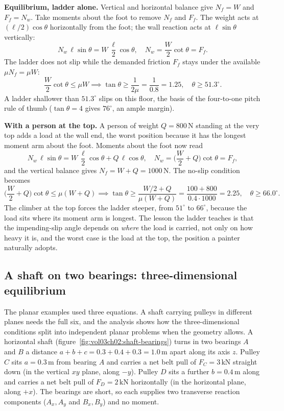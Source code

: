 \textbf{Equilibrium, ladder alone.} Vertical and horizontal balance give
$N_f = W$ and $F_f = N_w$. Take moments about the foot to remove $N_f$ and
$F_f$. The weight acts at $(\ell/2)\cos\theta$ horizontally from the foot;
the wall reaction acts at $\ell\sin\theta$ vertically:
\[
N_w \,\ell\sin\theta = W\,\frac{\ell}{2}\cos\theta, \quad
N_w = \frac{W}{2}\cot\theta = F_f.
\]
The ladder does not slip while the demanded friction $F_f$ stays under the
available $\mu N_f = \mu W$:
\[
\frac{W}{2}\cot\theta \le \mu W \implies
\tan\theta \ge \frac{1}{2\mu} = \frac{1}{0.8} = 1.25, \quad
\theta \ge 51.3^{\circ}.
\]
A ladder shallower than $51.3^{\circ}$ slips on this floor, the basis of the
four-to-one pitch rule of thumb ($\tan\theta = 4$ gives $76^{\circ}$, an
ample margin).

\textbf{With a person at the top.} A person of weight $Q = 800\,\text{N}$
standing at the very top adds a load at the wall end, the worst position
because it has the longest moment arm about the foot. Moments about the foot
now read
\[
N_w\,\ell\sin\theta = W\,\frac{\ell}{2}\cos\theta + Q\,\ell\cos\theta,
\quad N_w = \Big(\frac{W}{2} + Q\Big)\cot\theta = F_f,
\]
and the vertical balance gives $N_f = W + Q = 1000\,\text{N}$. The no-slip
condition becomes
\[
\Big(\frac{W}{2} + Q\Big)\cot\theta \le \mu (W + Q) \implies
\tan\theta \ge \frac{W/2 + Q}{\mu (W + Q)}
= \frac{100 + 800}{0.4 \cdot 1000} = 2.25, \quad
\theta \ge 66.0^{\circ}.
\]
The climber at the top forces the ladder steeper, from $51^{\circ}$ to
$66^{\circ}$, because the load sits where its moment arm is longest. The
lesson the ladder teaches is that the impending-slip angle depends on
\emph{where} the load is carried, not only on how heavy it is, and the
worst case is the load at the top, the position a painter naturally adopts.

\subsection{A shaft on two bearings: three-dimensional equilibrium}

The planar examples used three equations. A shaft carrying pulleys in
different planes needs the full six, and the analysis shows how the
three-dimensional conditions split into independent planar problems when the
geometry allows. A horizontal shaft (figure~\ref{fig:vol03ch02:shaft-bearings})
turns in two bearings $A$ and $B$ a distance $a + b + c = 0.3 + 0.4 + 0.3 =
1.0\,\si{\meter}$ apart along its axis $z$. Pulley $C$ sits
$a = 0.3\,\si{\meter}$ from bearing $A$ and carries a net belt pull of
$F_C = 3\,\text{kN}$ straight down (in the vertical $xy$ plane, along $-y$).
Pulley $D$ sits a further $b = 0.4\,\si{\meter}$ along and carries a net
belt pull of $F_D = 2\,\text{kN}$ horizontally (in the horizontal plane,
along $+x$). The bearings are short, so each supplies two transverse
reaction components ($A_x, A_y$ and $B_x, B_y$) and no moment.

